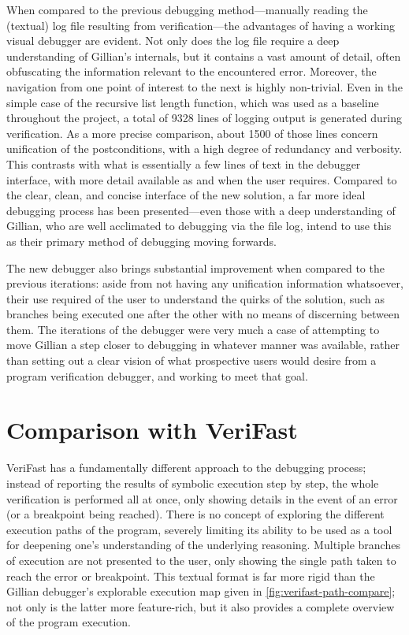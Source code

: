 When compared to the previous debugging method---manually reading the (textual)
log file resulting from verification---the advantages of having a working visual
debugger are evident. Not only does the log file require a deep understanding of
Gillian's internals, but it contains a vast amount of detail, often obfuscating
the information relevant to the encountered error. Moreover, the navigation from
one point of interest to the next is highly non-trivial. Even in the simple case
of the recursive list length function, which was used as a baseline throughout
the project, a total of 9328 lines of logging output is generated during
verification. As a more precise comparison, about 1500 of those lines concern
unification of the postconditions, with a high degree of redundancy and
verbosity. This contrasts with what is essentially a few lines of text in the
debugger interface, with more detail available as and when the user requires.
Compared to the clear, clean, and concise interface of the new solution, a far
more ideal debugging process has been presented---even those with a deep
understanding of Gillian, who are well acclimated to debugging via the file log,
intend to use this as their primary method of debugging moving forwards.


The new debugger also brings substantial improvement when compared to the
previous iterations: aside from not having any unification information
whatsoever, their use required of the user to understand the quirks of the
solution, such as branches being executed one after the other with no means of
discerning between them. The iterations of the debugger were very much a case of
attempting to move Gillian a step closer to debugging in whatever manner was
available, rather than setting out a clear vision of what prospective users
would desire from a program verification debugger, and working to meet that
goal.

\section{Comparison with VeriFast}

VeriFast has a fundamentally different approach to the debugging process;
instead of reporting the results of symbolic execution step by step, the whole
verification is performed all at once, only showing details in the event of an
error (or a breakpoint being reached). There is no concept of exploring the
different execution paths of the program, severely limiting its ability to be
used as a tool for deepening one's understanding of the underlying reasoning.
Multiple branches of execution are not presented to the user, only showing the
single path taken to reach the error or breakpoint. This textual format is far
more rigid than the Gillian debugger's explorable execution map given in
\autoref{fig:verifast-path-compare}; not only is the latter more feature-rich,
but it also provides a complete overview of the program execution.

